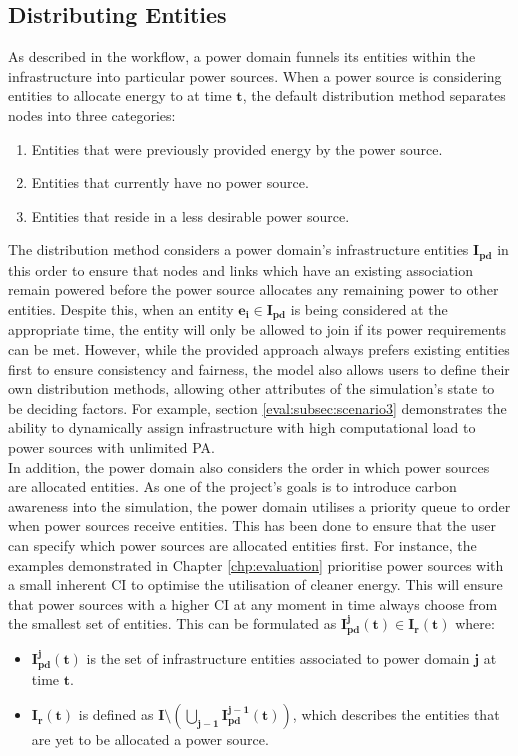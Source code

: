 \documentclass{l4proj}
\begin{document}
\subsection{Distributing Entities}\label{subsec:distributing-entities}
As described in the workflow, a power domain funnels its entities within the infrastructure into particular power sources.
When a power source is considering entities to allocate energy to at time $\mathbf{t}$, the default distribution method separates nodes into three categories:
\begin{enumerate}
    \item Entities that were previously provided energy by the power source.
    \item Entities that currently have no power source.
    \item Entities that reside in a less desirable power source.
\end{enumerate}

The distribution method considers a power domain's infrastructure entities $\mathbf{I_{pd}}$ in this order to ensure that nodes and links which have an existing association remain powered before the power source allocates any remaining power to other entities.
Despite this, when an entity $\mathbf{e_{i} \in I_{pd}}$ is being considered at the appropriate time, the entity will only be allowed to join if its power requirements can be met.
However, while the provided approach always prefers existing entities first to ensure consistency and fairness, the model also allows users to define their own distribution methods, allowing other attributes of the simulation's state to be deciding factors.
For example, section \ref{eval:subsec:scenario3} demonstrates the ability to dynamically assign infrastructure with high computational load to power sources with unlimited PA.\\

In addition, the power domain also considers the order in which power sources are allocated entities.
As one of the project's goals is to introduce carbon awareness into the simulation, the power domain utilises a priority queue to order when power sources receive entities.
This has been done to ensure that the user can specify which power sources are allocated entities first.
For instance, the examples demonstrated in Chapter \ref{chp:evaluation} prioritise power sources with a small inherent CI to optimise the utilisation of cleaner energy.
This will ensure that power sources with a higher CI at any moment in time always choose from the smallest set of entities.
This can be formulated as $\mathbf{I_{pd}^j(t) \in I_{r}(t)}$ where:
\begin{itemize}
    \item $\mathbf{I_{pd}^j(t)}$ is the set of infrastructure entities associated to power domain $\mathbf{j}$ at time $\mathbf{t}$.\\
    \item $\mathbf{I_{r}(t)}$ is defined as $\mathbf{I \setminus \left( \bigcup_{j-1} I_{pd}^{j-1}(t) \right)}$, which describes the entities that are yet to be allocated a power source.
\end{itemize}
\end{document}
